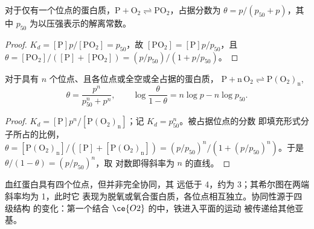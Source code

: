 \begin{proposition}[单个位点]\label{prop:b3:bioinorganic:hyperbola}
对于仅有一个位点的蛋白质，$\mathrm{P + O_2 \rightleftharpoons PO_2}$，占据分数为 $\theta = p/(p_{50} + p)$，其中 $p_{50}$
为以压强表示的解离常数。
\end{proposition}

\begin{proof}
$K_d = [\mathrm P]p/[\mathrm{PO_2}] = p_{50}$，故 $[\mathrm{PO_2}] = [\mathrm P]p/p_{50}$，且 $\theta = [\mathrm{PO_2}]/([\mathrm P] + [\mathrm{PO_2}]) = (p/p_{50})/(1 + p/p_{50})$。
\end{proof}

\begin{theorem}[希尔方程]\label{thm:b3:bioinorganic:hill}
对于具有 $n$ 个位点、且各位点或全空或全占据的蛋白质，
$\mathrm{P + n\,O_2 \rightleftharpoons P(O_2)_n}$,
\[
  \theta = \frac{p^n}{p_{50}^n + p^n}, \qquad \log\frac{\theta}{1 - \theta} = n\log p - n\log p_{50}.
\]
\end{theorem}

\begin{proof}
$K_d = [\mathrm P]p^n/[\mathrm{P(O_2)_n}]$；记 $K_d = p_{50}^n$。被占据位点的分数
即填充形式分子所占的比例，$\theta = [\mathrm{P(O_2)_n}]/([\mathrm P] + [\mathrm{P(O_2)_n}]) = (p/p_{50})^n/(1 + (p/p_{50})^n)$。于是 $\theta/(1 - \theta) = (p/p_{50})^n$，取
对数即得斜率为 $n$ 的直线。
\end{proof}

血红蛋白具有四个位点，但并非完全协同，其
远低于 4，约为 3；其希尔图在两端斜率均为 1，此时它
表现为脱氧或氧合蛋白质，各位点相互独立。协同性源于四级结构
的变化：第一个结合 $\ce{O2}$ 的中，铁进入平面的运动
被传递给其他亚基。

